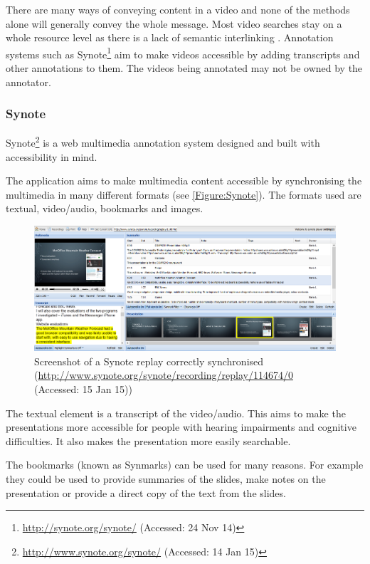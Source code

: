 There are many ways of conveying content in a video and none of the methods alone will generally convey the whole message. Most video searches stay on a whole resource level as there is a lack of semantic interlinking \citep{eps273063}. Annotation systems such as Synote\footnote{\url{http://synote.org/synote/} (Accessed: 24 Nov 14)} aim to make videos accessible by adding transcripts and other annotations to them. The videos being annotated may not be owned by the annotator.

\subsubsection{Synote}
\label{Subsection:Synote}
Synote\footnote{\url{http://www.synote.org/synote/} (Accessed: 14 Jan 15)} is a web multimedia annotation system designed and built with accessibility in mind. 

The application aims to make multimedia content accessible by synchronising the multimedia in many different formats (see \autoref{Figure:Synote}). The formats used are textual, video/audio, bookmarks and images. 

\begin{figure}[h!]
	\centering 
		\includegraphics[scale=0.4]{../figures/synote_sync.png} 		
	\caption{\label{Figure:Synote} Screenshot of a Synote replay correctly synchronised (\url{http://www.synote.org/synote/recording/replay/114674/0} (Accessed: 15 Jan 15))}
\end{figure}

The textual element is a transcript of the video/audio. This aims to make the presentations more accessible for people with hearing impairments and cognitive difficulties. It also makes the presentation more easily searchable.

The bookmarks (known as Synmarks) can be used for many reasons. For example they could be used to provide summaries of the slides, make notes on the presentation or provide a direct copy of the text from the slides.

